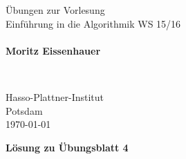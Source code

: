 \documentclass{scrartcl}
\theoremstyle{remark}
\begin{document}
\pagestyle{plain}


\noindent
\begin{minipage}{0.66\textwidth}
Übungen zur Vorlesung\\
Einführung in die Algorithmik WS 15/16\\
~\\
\textbf{Moritz Eissenhauer}
\end{minipage}
~
\begin{minipage}{0.30\textwidth}
Hasso-Plattner-Institut\\
Potsdam\\
\today
\end{minipage}


\begin{center}
 \huge \bf Lösung zu Übungsblatt 4
\end{center}
\end{document}

